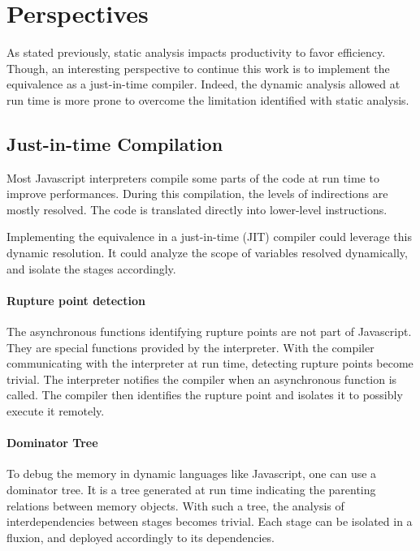 \section{Perspectives} \label{chapter6:perspective}

As stated previously, static analysis impacts productivity to favor efficiency.
Though, an interesting perspective to continue this work is to implement the equivalence as a just-in-time compiler.
Indeed, the dynamic analysis allowed at run time is more prone to overcome the limitation identified with static analysis.

\subsection{Just-in-time Compilation}

Most Javascript interpreters compile some parts of the code at run time to improve performances.
During this compilation, the levels of indirections are mostly resolved.
The code is translated directly into lower-level instructions.

Implementing the equivalence in a just-in-time (JIT) compiler could leverage this dynamic resolution.
It could analyze the scope of variables resolved dynamically, and isolate the stages accordingly.

\paragraph{Rupture point detection}

The asynchronous functions identifying rupture points are not part of Javascript.
They are special functions provided by the interpreter.
With the compiler communicating with the interpreter at run time, detecting rupture points become trivial.
The interpreter notifies the compiler when an asynchronous function is called.
The compiler then identifies the rupture point and isolates it to possibly execute it remotely.

\paragraph{Dominator Tree}

To debug the memory in dynamic languages like Javascript, one can use a dominator tree.
It is a tree generated at run time indicating the parenting relations between memory objects.
With such a tree, the analysis of interdependencies between stages becomes trivial.
Each stage can be isolated in a fluxion, and deployed accordingly to its dependencies.

